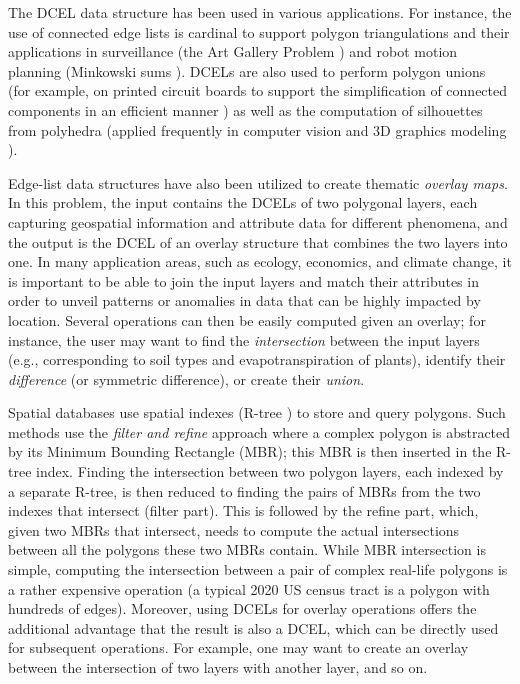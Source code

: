 The DCEL data structure has been used in various applications. For instance, the use of connected edge lists is cardinal to support polygon triangulations and their applications in surveillance (the Art Gallery Problem \cite{chvatal_combinatorial_1975, orourke_art_1987}) and robot motion planning (Minkowski sums \cite{berg_computational_2008, chew_convex_1993}). DCELs are also used to perform polygon unions (for example, on printed circuit boards to support the simplification of connected components in an efficient manner \cite{fogel_cgal_2012}) as well as the computation of silhouettes from polyhedra \cite{fogel_cgal_2012, berberich_arrangements_2010} (applied frequently in computer vision and 3D graphics modeling \cite{boguslawski_modelling_2011}).

Edge-list data structures have also been utilized to create thematic \textit{overlay maps}. In this problem, the input contains the DCELs of two polygonal layers, each capturing geospatial information and attribute data for different phenomena, and the output is the DCEL of an overlay structure that combines the two layers into one. In many application areas, such as ecology, economics, and climate change, it is important to be able to join the input layers and match their attributes in order to unveil patterns or anomalies in data that can be highly impacted by location. Several operations can then be easily computed given an overlay; for instance, the user may want to find the \textit{intersection} between the input layers (e.g., corresponding to soil types and evapotranspiration of plants), identify their \textit{difference} (or symmetric difference), or create their \textit{union}. 

Spatial databases use spatial indexes (R-tree \cite{rtree, rstar}) to store and query polygons. Such methods use the \textit{filter and refine} approach where a complex polygon is abstracted by its Minimum Bounding Rectangle (MBR); this MBR is then inserted in the R-tree index. Finding the intersection between two polygon layers, each indexed by a separate R-tree, is then reduced to finding the pairs of MBRs from the two indexes that intersect (filter part). This is followed by the refine part, which, given two MBRs that intersect, needs to compute the actual intersections between all the polygons these two MBRs contain. While MBR intersection is simple, computing the intersection between a pair of complex real-life polygons is a rather expensive operation (a typical 2020 US census tract is a polygon with hundreds of edges). 
Moreover, using DCELs for overlay operations offers the additional advantage that the result is also a DCEL, which can be directly used for subsequent operations. For example, one may want to create an overlay between the intersection of two layers with another layer, and so on. 

